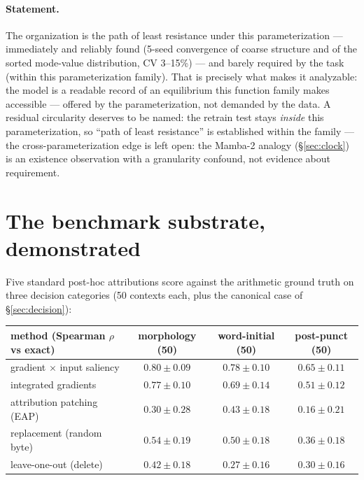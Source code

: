 \documentclass[11pt]{article}
\begin{document}
\paragraph{Statement.}
The organization is the path of least resistance under this
parameterization --- immediately and reliably found (5-seed convergence of
coarse structure and of the sorted mode-value distribution, CV 3--15\%)
--- and barely required by the task (within this parameterization family).
That is precisely what makes it
analyzable: the model is a readable record of an equilibrium this
function family makes accessible --- offered by the parameterization, not
demanded by the data. A residual circularity deserves to be
named: the retrain test stays \emph{inside} this parameterization, so
``path of least resistance'' is established within the family --- the
cross-parameterization edge is left open: the Mamba-2 analogy
(\S\ref{sec:clock}) is an existence observation with a granularity
confound, not evidence about requirement.

\section{The benchmark substrate, demonstrated}
\label{sec:benchmark}

\noindent{}

\vspace{0.5em}
Five standard post-hoc attributions score against the arithmetic ground
truth on three decision categories (50 contexts each, plus the canonical
case of \S\ref{sec:decision}):

\begin{center}
\small
\begin{tabular}{lccc}
\toprule
method (Spearman $\rho$ vs exact) & morphology (50) & word-initial (50) & post-punct (50) \\
\midrule
gradient $\times$ input saliency & $0.80 \pm 0.09$ & $0.78 \pm 0.10$ & $0.65 \pm 0.11$ \\
integrated gradients & $0.77 \pm 0.10$ & $0.69 \pm 0.14$ & $0.51 \pm 0.12$ \\
attribution patching (EAP) & $0.30 \pm 0.28$ & $0.43 \pm 0.18$ & $0.16 \pm 0.21$ \\
replacement (random byte) & $0.54 \pm 0.19$ & $0.50 \pm 0.18$ & $0.36 \pm 0.18$ \\
leave-one-out (delete) & $0.42 \pm 0.18$ & $0.27 \pm 0.16$ & $0.30 \pm 0.16$ \\
\bottomrule
\end{tabular}
\end{center}
\end{document}
